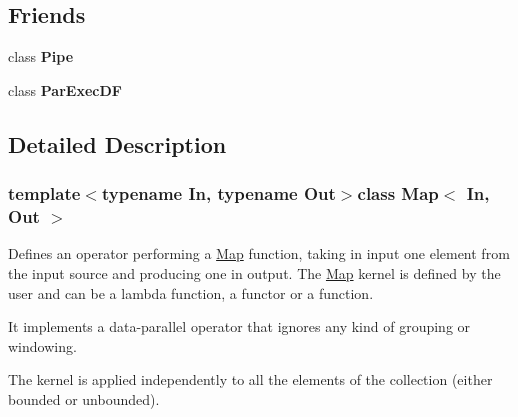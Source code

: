 \subsection*{\-Friends}
\begin{DoxyCompactItemize}
\item 
\hypertarget{class_map_adb788d0aa2d64624d3602a985936d7da}{class {\bfseries \-Pipe}}\label{class_map_adb788d0aa2d64624d3602a985936d7da}

\item 
\hypertarget{class_map_a298bf270ce895db324d65478b3b01f5b}{class {\bfseries \-Par\-Exec\-D\-F}}\label{class_map_a298bf270ce895db324d65478b3b01f5b}

\end{DoxyCompactItemize}


\subsection{\-Detailed \-Description}
\subsubsection*{template$<$typename In, typename Out$>$class Map$<$ In, Out $>$}

\-Defines an operator performing a \hyperlink{class_map}{\-Map} function, taking in input one element from the input source and producing one in output. \-The \hyperlink{class_map}{\-Map} kernel is defined by the user and can be a lambda function, a functor or a function.

\-It implements a data-\/parallel operator that ignores any kind of grouping or windowing.

\-The kernel is applied independently to all the elements of the collection (either bounded or unbounded). 

